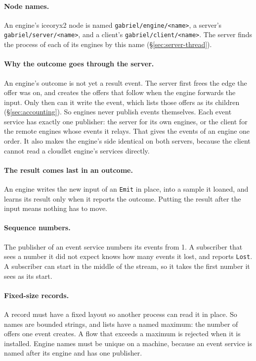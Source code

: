 \documentclass[11pt]{article}
\newcommand{\code}[1]{\texttt{#1}}
\begin{document}
\paragraph{Node names.} An engine's iceoryx2 node is named
\code{gabriel/engine/<name>}, a server's \code{gabriel/server/<name>}, and a
client's \code{gabriel/client/<name>}.
The server finds the process of each of its engines by this name
(\S\ref{sec:server-thread}).

\paragraph{Why the outcome goes through the server.} An engine's outcome is
not yet a result event. The server first frees the edge the offer was on, and
creates the offers that follow when the engine forwards the input. Only then
can it write the event, which lists those offers as its children
(\S\ref{sec:accounting}). So engines never publish events themselves. Each
event service has exactly one publisher: the server for its own engines, or
the client for the remote engines whose events it relays. That gives the
events of an engine one order. It also makes the engine's side identical on
both servers, because the client cannot read a cloudlet engine's services
directly.

\paragraph{The result comes last in an outcome.} An engine writes the new
input of an \code{Emit} in place, into a sample it loaned, and learns its
result only when it reports the outcome. Putting the result after the input
means nothing has to move.

\paragraph{Sequence numbers.} The publisher of an event service numbers its
events from 1. A subscriber that sees a number it did not expect knows how
many events it lost, and reports \code{Lost}. A subscriber can start in the
middle of the stream, so it takes the first number it sees as its start.

\paragraph{Fixed-size records.} A record must have a fixed layout so another
process can read it in place. So names are bounded strings, and lists have a
named maximum: the number of offers one event creates. A flow that exceeds a maximum is rejected when it is installed.
Engine names must be unique on a machine, because an event service is named
after its engine and has one publisher.
\end{document}
